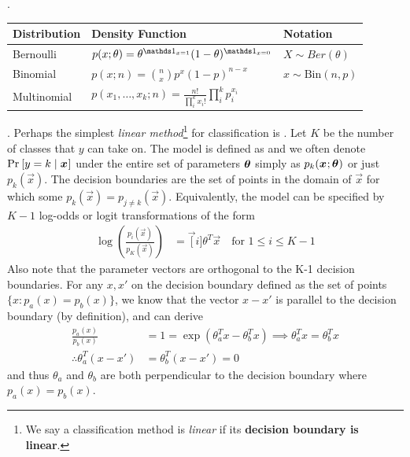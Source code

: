 \documentclass[11pt]{article}
\begin{document}
\myspace
\p {}.

\begin{tabular}{l | l | l}
	Distribution & Density Function & Notation \\ \hline \hline 
	Bernoulli 
		& $p(x; \theta) = \theta^{\ind_{x=1}} (1 - \theta)^{\ind_{x=0}}$ 
		& $X \sim Ber(\theta)$ \\ \hline  
	Binomial 
		& $p(x; n) = \binom{n}{x} p^x (1 - p)^{n - x}$ 
		& $x \sim \text{Bin}(n, p)$ \\ \hline  
	Multinomial 
		& $p(x_1,\ldots,x_k; n) = \frac{n!}{\prod_i^k x_i!} \prod_i^k p_i^{x_i}  $ 
		& \\ \hline
\end{tabular}


\myspace
\p {}. Perhaps the simplest \textit{linear method}\footnote{We say a classification method is \textit{linear} if its \textbf{decision boundary is linear}.} for classification is . Let $K$ be the number of classes that $y$ can take on. The model is defined as
and we often denote $\text{Pr}_{}\left[y = k \mid \bm{x}_{}\right]$ under the entire set of parameters $\bm{\theta}_{}$ simply as $p_k(\bm{x}_{}; \bm{\theta}_{})$ or just $p_k(\vec x)$. The decision boundaries are the set of points in the domain of $\vec x$ for which some $p_k(\vec x) = p_{j \ne k}(\vec x)$. Equivalently, the model can be specified by $K-1$ log-odds or logit transformations of the form
\begin{align}
	\log\left(  \frac{p_i(\vec x)}{p_K(\vec x)} \right) &= \vec[i]{\theta}^T \vec x
	\quad \text{for } 1 \le i \le K - 1
\end{align}
Also note that the parameter vectors are orthogonal to the K-1 decision boundaries. For any $x, x'$ on the decision boundary defined as the set of points $\{x: p_a(x) = p_b(x) \}$, we know that the vector $x - x'$ is parallel to the decision boundary (by definition), and can derive
\begin{align}
	\frac{p_a(x)}{p_b(x)} &= 1 = \exp(\theta_a^T x - \theta_b^T x) \implies \theta_a^T x = \theta_b^T x \\
	\therefore \theta_a^T (x-x') &= \theta_b^T (x - x') = 0
\end{align}
and thus $\theta_a$ and $\theta_b$ are both perpendicular to the decision boundary where $p_a(x) = p_b(x)$. 
\end{document}
